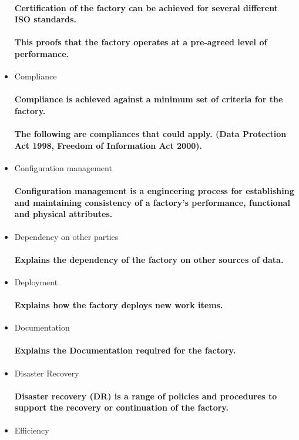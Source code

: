 \documentclass{acm_proc_article-sp}
\begin{document}
\begin{itemize}
\paragraph{Certification of the factory can be achieved for several different ISO standards.}
\paragraph{This proofs that the factory operates at a pre-agreed level of performance.}
\item Compliance
\paragraph{Compliance is achieved against a minimum set of criteria for the factory.}
\paragraph{The following are compliances that could apply. (Data Protection Act 1998, Freedom of Information Act 2000).}
\item Configuration management
\paragraph{Configuration management is a engineering process for establishing and maintaining consistency of a factory's performance, functional and physical attributes.}
\item Dependency on other parties
\paragraph{Explains the dependency of the factory on other sources of data.}
\item Deployment
\paragraph{Explains how the factory deploys new work items.}
\item Documentation
\paragraph{Explains the Documentation required for the factory.}
\item Disaster Recovery
\paragraph{Disaster recovery (DR) is a range of policies and procedures to support the recovery or continuation of the factory.}
\item Efficiency

\end{itemize}
\end{document}
